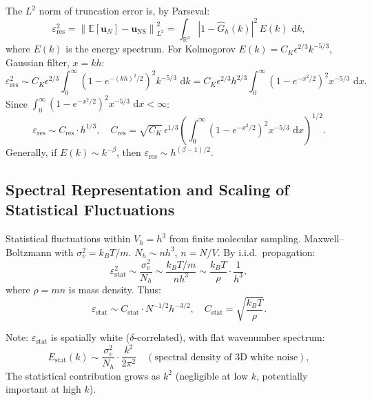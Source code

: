 \documentclass[11pt,a4paper]{article}
\theoremstyle{definition}
\theoremstyle{remark}
\newcommand{\R}{\mathbb{R}}
\newcommand{\E}{\mathbb{E}}
\newcommand{\norm}[1]{\left\lVert#1\right\rVert}
\newcommand{\abs}[1]{\left\lvert#1\right\rvert}
\newcommand{\dd}{\,\mathrm{d}}
\newcommand{\uN}{\bm{u}_N}
\newcommand{\uNS}{\bm{u}_{\text{NS}}}
\newcommand{\epsRes}{\varepsilon_{\text{res}}}
\newcommand{\epsStat}{\varepsilon_{\text{stat}}}
\begin{document}
The $L^2$ norm of truncation error is, by Parseval:
\begin{equation}\label{eq:eps_res_spectral}
  \epsRes^2 = \norm{\E[\uN] - \uNS}_{L^2}^2
  = \int_{\R^3} \abs{1 - \hat{G}_h(k)}^2 \, E(k)\,\dd k,
\end{equation}
where $E(k)$ is the energy spectrum. For Kolmogorov $E(k) = C_K \epsilon^{2/3} k^{-5/3}$, Gaussian filter, $x = kh$:
\begin{equation}\label{eq:eps_res_kolmogorov}
  \epsRes^2 \sim C_K \epsilon^{2/3} \int_{0}^{\infty} (1 - e^{-(kh)^2/2})^2 k^{-5/3}\,\dd k
  = C_K \epsilon^{2/3} h^{2/3} \int_{0}^{\infty} (1 - e^{-x^2/2})^2 x^{-5/3}\,\dd x.
\end{equation}
Since $\int_{0}^{\infty} (1 - e^{-x^2/2})^2 x^{-5/3}\,\dd x < \infty$:
\begin{equation}\label{eq:eps_res_scaling_final}
  \epsRes \sim C_{\text{res}} \cdot h^{1/3},
  \quad C_{\text{res}} = \sqrt{C_K}\,\epsilon^{1/3}\left(\int_{0}^{\infty} (1 - e^{-x^2/2})^2 x^{-5/3}\,\dd x\right)^{1/2}.
\end{equation}
Generally, if $E(k) \sim k^{-\beta}$, then $\epsRes \sim h^{(\beta-1)/2}$.

\subsection{Spectral Representation and Scaling of Statistical Fluctuations}

Statistical fluctuations within $V_h = h^3$ from finite molecular sampling. Maxwell--Boltzmann with $\sigma_v^2 = k_B T/m$. $N_h \sim n h^3$, $n = N/V$. By i.i.d.\ propagation:
\begin{equation}\label{eq:eps_stat_detail}
  \epsStat^2 \sim \frac{\sigma_v^2}{N_h} \sim \frac{k_B T/m}{n h^3}
  \sim \frac{k_B T}{\rho} \cdot \frac{1}{h^3},
\end{equation}
where $\rho = mn$ is mass density. Thus:
\begin{equation}\label{eq:eps_stat_scaling_final}
  \epsStat \sim C_{\text{stat}} \cdot N^{-1/2} h^{-3/2},
  \quad C_{\text{stat}} = \sqrt{\frac{k_B T}{\rho}}.
\end{equation}

Note: $\epsStat$ is spatially white ($\delta$-correlated), with flat wavenumber spectrum:
\begin{equation}\label{eq:stat_spectrum}
  E_{\text{stat}}(k) \sim \frac{\sigma_v^2}{N_h} \cdot \frac{k^2}{2\pi^2} \quad (\text{spectral density of 3D white noise}),
\end{equation}
The statistical contribution grows as $k^2$ (negligible at low $k$, potentially important at high $k$).
\end{document}
